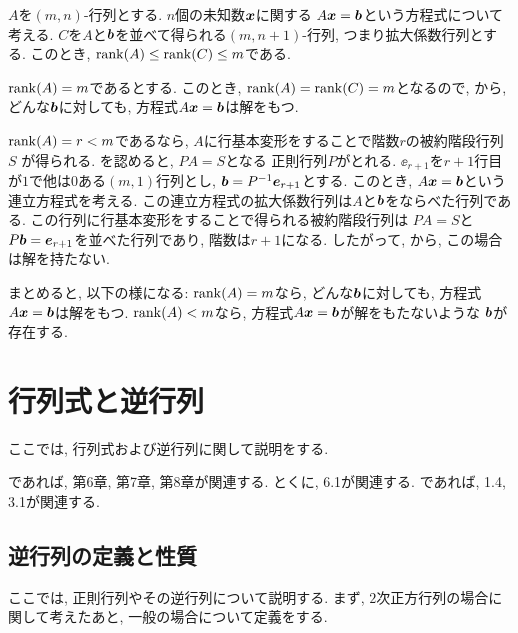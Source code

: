 \begin{remark}
  \label{rem:syslineq:rank:gen}
  $A$を$(m,n)$-行列とする.
  $n$個の未知数$\boldsymbol{x}$に関する
  $A\boldsymbol{x}=\boldsymbol{b}$という方程式について考える.
  $C$を$A$と$\boldsymbol{b}$を並べて得られる$(m,n+1)$-行列,
  つまり拡大係数行列とする.
  このとき, $\operatorname{rank}(A)\leq \operatorname{rank}(C)\leq m$である.

  $\operatorname{rank}(A)=m$であるとする.
  このとき,
  $\operatorname{rank}(A)=\operatorname{rank}(C)=m$となるので,  
  から,
  どんな$\boldsymbol{b}$に対しても, 
  方程式$A\boldsymbol{x}=\boldsymbol{b}$は解をもつ.

  $\operatorname{rank}(A)=r<m$であるなら,
  $A$に行基本変形をすることで階数$r$の被約階段行列$S$
  が得られる.
  を認めると,
  $PA=S$となる
  正則行列$P$がとれる.
  $\ee_{r+1}$を$r+1$行目が$1$で他は$0$ある$(m,1)$行列とし,
  $\boldsymbol{b}=P^{-1}\boldsymbol{e}_{r+1}$とする.
  このとき,
  $A\boldsymbol{x}=\boldsymbol{b}$という連立方程式を考える.
  この連立方程式の拡大係数行列は$A$と$\boldsymbol{b}$をならべた行列である.
  この行列に行基本変形をすることで得られる被約階段行列は
  $PA=S$と
  $P\boldsymbol{b}=\boldsymbol{e}_{r+1}$を並べた行列であり,
  階数は$r+1$になる.  したがって,
  から,
  この場合は解を持たない.

  まとめると, 以下の様になる:
$\operatorname{rank}(A)=m$なら,
  どんな$\boldsymbol{b}$に対しても, 
  方程式$A\boldsymbol{x}=\boldsymbol{b}$は解をもつ.
$\operatorname{rank}(A)<m$なら,
  方程式$A\boldsymbol{x}=\boldsymbol{b}$が解をもたないような
  $\boldsymbol{b}$が存在する.
\end{remark}






\chapter{行列式と逆行列}
\label{chap:inverse}
ここでは,
行列式および逆行列に関して説明をする.



\cite{978-4-7806-0772-7}であれば,
第6章, 第7章, 第8章が関連する.
とくに, 6.1が関連する.
\cite{978-4-7806-0164-0}であれば,
1.4, 3.1が関連する.

\section{逆行列の定義と性質}
\label{sec:regular}
ここでは, 正則行列やその逆行列について説明する.
まず,
$2$次正方行列の場合に関して考えたあと,
一般の場合について定義をする.


